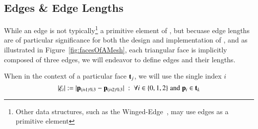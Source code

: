\subsection{Edges \& Edge Lengths}
\label{chBsEEL}
While an edge is not typically\footnote{Other data structures, such as the Winged-Edge~\cite[p.~1]{Baumgart75}, may use edges as a primitive element} a primitive element of \tdd{}, but becuase edge lengths are of particular significance for both the design and implementation of , and as illustrated in Figure~\ref{fig:facesOfAMesh}, each triangular face is implicitly composed of three edges, we will endeavor to define edges and their lengths.

When in the context of a particular face $\mathbf{t}_j$, we will use the single index $i$
\begin{equation}
	|\xi_i| := |\bp_{(\sipo)\%3} - \bp_{(\sipt)\%3}| \;:\; \forall i \in\{0,1,2\} \;\text{and}\; \bp_i \in \bt_k
	\label{eq:defineEdgeLengthFace}
\end{equation}%

